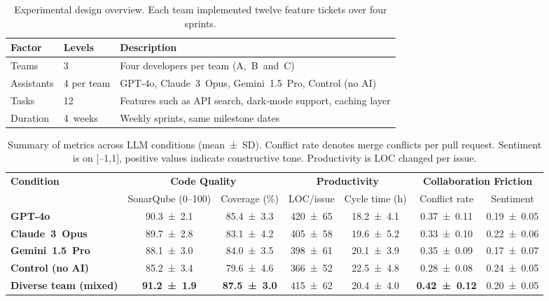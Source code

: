 \documentclass[conference]{IEEEtran}
\begin{document}
\begin{table}[t]
\centering
\caption{Experimental design overview.  Each team implemented twelve feature tickets over four sprints.}
\label{tab:design}
\begin{tabular}{p{2.5cm}p{2cm}p{3cm}}
\toprule
\textbf{Factor} & \textbf{Levels} & \textbf{Description}\\
\midrule
Teams & 3 & Four developers per team (A, B and C) \\
Assistants & 4 per team & GPT‑4o, Claude 3 Opus, Gemini 1.5 Pro, Control (no AI) \\
Tasks & 12 & Features such as API search, dark‑mode support, caching layer \\
Duration & 4 weeks & Weekly sprints, same milestone dates \\
\bottomrule
\end{tabular}
\end{table}

\begin{table*}[t]
\centering
\caption{Summary of metrics across LLM conditions (mean ± SD).  Conflict rate denotes merge conflicts per pull request.  Sentiment is on [–1,1], positive values indicate constructive tone.  Productivity is LOC changed per issue.}
\label{tab:results}
\begin{tabular}{lcccccc}
\toprule
\multirow{2}{*}{\textbf{Condition}} & \multicolumn{2}{c}{\textbf{Code Quality}} & \multicolumn{2}{c}{\textbf{Productivity}} & \multicolumn{2}{c}{\textbf{Collaboration Friction}} \\
 & SonarQube (0–100) & Coverage (\%) & LOC/issue & Cycle time (h) & Conflict rate & Sentiment \\
\midrule
\textbf{GPT‑4o} & 90.3 ± 2.1 & 85.4 ± 3.3 & 420 ± 65 & 18.2 ± 4.1 & 0.37 ± 0.11 & 0.19 ± 0.05 \\
\textbf{Claude 3 Opus} & 89.7 ± 2.8 & 83.1 ± 4.2 & 405 ± 58 & 19.6 ± 5.2 & 0.33 ± 0.10 & 0.22 ± 0.06 \\
\textbf{Gemini 1.5 Pro} & 88.1 ± 3.0 & 84.0 ± 3.5 & 398 ± 61 & 20.1 ± 3.9 & 0.35 ± 0.09 & 0.17 ± 0.07 \\
\textbf{Control (no AI)} & 85.2 ± 3.4 & 79.6 ± 4.6 & 366 ± 52 & 22.5 ± 4.8 & 0.28 ± 0.08 & 0.24 ± 0.05 \\
\midrule
\textbf{Diverse team (mixed)} & \textbf{91.2 ± 1.9} & \textbf{87.5 ± 3.0} & 415 ± 62 & 20.4 ± 4.0 & \textbf{0.42 ± 0.12} & 0.20 ± 0.05 \\
\bottomrule
\end{tabular}
\end{table*}
\end{document}
